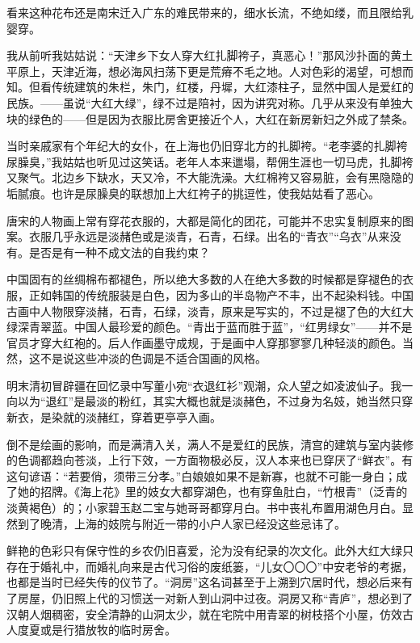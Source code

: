 \par 看来这种花布还是南宋迁入广东的难民带来的，细水长流，不绝如缕，而且限给乳婴穿。
\par 我从前听我姑姑说：“天津乡下女人穿大红扎脚袴子，真恶心！”那风沙扑面的黄土平原上，天津近海，想必海风扫荡下更是荒瘠不毛之地。人对色彩的渴望，可想而知。但看传统建筑的朱栏，朱门，红楼，丹墀，大红漆柱子，显然中国人是爱红的民族。——虽说“大红大绿”，绿不过是陪衬，因为讲究对称。几乎从来没有单独大块的绿色的——但是因为衣服比房舍更接近个人，大红在新房新妇之外成了禁条。
\par 当时亲戚家有个年纪大的女仆，在上海也仍旧穿北方的扎脚袴。“老李婆的扎脚袴尿臊臭，”我姑姑也听见过这笑话。老年人本来邋塌，帮佣生涯也一切马虎，扎脚袴又聚气。北边乡下缺水，天又冷，不大能洗澡。大红棉袴又容易脏，会有黑隐隐的垢腻痕。也许是尿臊臭的联想加上大红袴子的挑逗性，使我姑姑看了恶心。
\par 唐宋的人物画上常有穿花衣服的，大都是简化的团花，可能并不忠实复制原来的图案。衣服几乎永远是淡赭色或是淡青，石青，石绿。出名的“青衣”“乌衣”从来没有。是否是有一种不成文法的自我约束？
\par 中国固有的丝绸棉布都褪色，所以绝大多数的人在绝大多数的时候都是穿褪色的衣服，正如韩国的传统服装是白色，因为多山的半岛物产不丰，出不起染料钱。中国古画中人物限穿淡赭，石青，石绿，淡青，原来是写实的，不过是褪了色的大红大绿深青翠蓝。中国人最珍爱的颜色。“青出于蓝而胜于蓝”，“红男绿女”——并不是官员才穿大红袍的。后人作画墨守成规，于是画中人穿那寥寥几种轻淡的颜色。当然，这不是说这些冲淡的色调是不适合国画的风格。
\par 明末清初冒辟疆在回忆录中写董小宛“衣退红衫”观潮，众人望之如凌波仙子。我一向以为“退红”是最淡的粉红，其实大概也就是淡赭色，不过身为名妓，她当然只穿新衣，是染就的淡赭红，穿着更亭亭入画。
\par 倒不是绘画的影响，而是满清入关，满人不是爱红的民族，清宫的建筑与室内装修的色调都趋向苍淡，上行下效，一方面物极必反，汉人本来也已穿厌了“鲜衣”。有这句谚语：“若要俏，须带三分孝。”白娘娘如果不是新寡，也就不可能一身白；成了她的招牌。《海上花》里的妓女大都穿湖色，也有穿鱼肚白，“竹根青”（泛青的淡黄褐色）的；小家碧玉赵二宝与她哥哥都穿月白。书中丧礼布置用湖色月白。显然到了晚清，上海的妓院与附近一带的小户人家已经没这些忌讳了。
\par 鲜艳的色彩只有保守性的乡农仍旧喜爱，沦为没有纪录的次文化。此外大红大绿只存在于婚礼中，而婚礼向来是古代习俗的废纸篓，“儿女〇〇〇”中安老爷的考据，也都是当时已经失传的仪节了。“洞房”这名词甚至于上溯到穴居时代，想必后来有了房屋，仍旧照上代的习惯送一对新人到山洞中过夜。洞房又称“青庐”，想必到了汉朝人烟稠密，安全清静的山洞太少，就在宅院中用青翠的树枝搭个小屋，仿效古人度夏或是行猎放牧的临时房舍。

